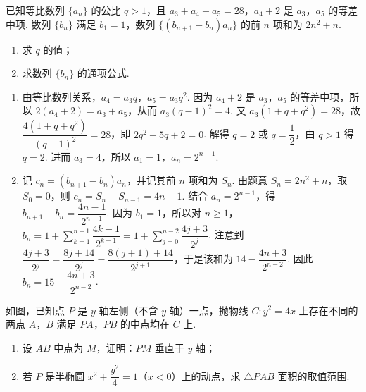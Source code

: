 \begin{problem}
已知等比数列 \(\{a_n\}\) 的公比 \(q>1\)，且 \(a_3+a_4+a_5=28\)，\(a_4+2\) 是 \(a_3\)，\(a_5\) 的等差中项. 数列 \(\{b_n\}\) 满足 \(b_1=1\)，数列 \(\{(b_{n+1}-b_n)a_n\}\) 的前 \(n\) 项和为 \(2n^2+n\).

\begin{enumerate}
  \item 求 \(q\) 的值；
  \item 求数列 \(\{b_n\}\) 的通项公式.
\end{enumerate}
\end{problem}

\begin{solution}
\begin{enumerate}
  \item 由等比数列关系，\(a_4=a_3q\)，\(a_5=a_3q^2\). 因为 \(a_4+2\) 是 \(a_3\)，\(a_5\) 的等差中项，所以 \(2(a_4+2)=a_3+a_5\)，从而 \(a_3(q-1)^2=4\). 又 \(a_3(1+q+q^2)=28\)，故 \(\dfrac{4(1+q+q^2)}{(q-1)^2}=28\)，即 \(2q^2-5q+2=0\). 解得 \(q=2\) 或 \(q=\dfrac12\)，由 \(q>1\) 得 \(q=2\). 进而 \(a_3=4\)，所以 \(a_1=1\)，\(a_n=2^{n-1}\).
  \item 记 \(c_n=(b_{n+1}-b_n)a_n\)，并记其前 \(n\) 项和为 \(S_n\). 由题意 \(S_n=2n^2+n\)，取 \(S_0=0\)，则 \(c_n=S_n-S_{n-1}=4n-1\). 结合 \(a_n=2^{n-1}\)，得 \(b_{n+1}-b_n=\dfrac{4n-1}{2^{n-1}}\). 因为 \(b_1=1\)，所以对 \(n\ge1\)，\(b_n=1+\displaystyle\sum_{k=1}^{n-1}\dfrac{4k-1}{2^{k-1}}=1+\displaystyle\sum_{j=0}^{n-2}\dfrac{4j+3}{2^j}\). 注意到 \(\dfrac{4j+3}{2^j}=\dfrac{8j+14}{2^j}-\dfrac{8(j+1)+14}{2^{j+1}}\)，于是该和为 \(14-\dfrac{4n+3}{2^{n-2}}\). 因此 \(b_n=15-\dfrac{4n+3}{2^{n-2}}\).
\end{enumerate}
\end{solution}

\begin{problem}
如图，已知点 \(P\) 是 \(y\) 轴左侧（不含 \(y\) 轴）一点，抛物线 \(C:y^2=4x\) 上存在不同的两点 \(A\)，\(B\) 满足 \(PA\)，\(PB\) 的中点均在 \(C\) 上.

\begin{enumerate}
  \item 设 \(AB\) 中点为 \(M\)，证明：\(PM\) 垂直于 \(y\) 轴；
  \item 若 \(P\) 是半椭圆 \(x^2+\dfrac{y^2}{4}=1\)（\(x<0\)）上的动点，求 \(\triangle PAB\) 面积的取值范围.
\end{enumerate}

\end{problem}

